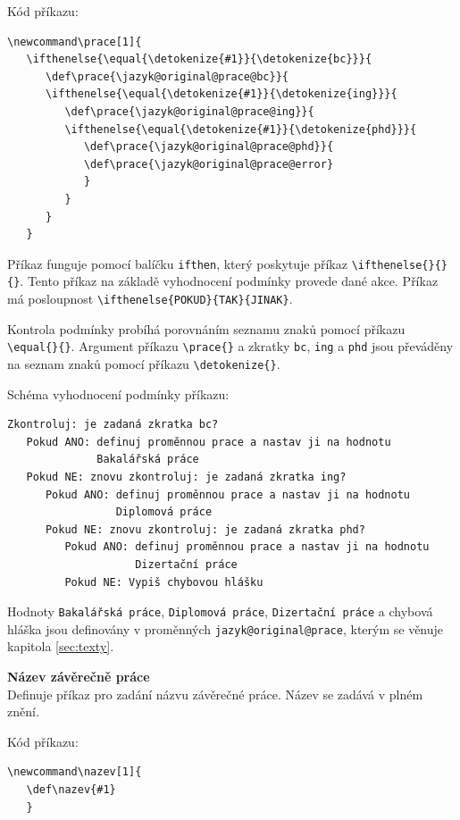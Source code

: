Kód příkazu:
\begin{verbatim}
\newcommand\prace[1]{
   \ifthenelse{\equal{\detokenize{#1}}{\detokenize{bc}}}{
      \def\prace{\jazyk@original@prace@bc}}{
      \ifthenelse{\equal{\detokenize{#1}}{\detokenize{ing}}}{
         \def\prace{\jazyk@original@prace@ing}}{
         \ifthenelse{\equal{\detokenize{#1}}{\detokenize{phd}}}{
            \def\prace{\jazyk@original@prace@phd}}{
            \def\prace{\jazyk@original@prace@error}
            }
         }
      }
   }
\end{verbatim}

Příkaz funguje pomocí balíčku \verb|ifthen|, který poskytuje příkaz \verb|\ifthenelse{}{}{}|. Tento příkaz na základě vyhodnocení podmínky provede dané akce. Příkaz má posloupnost \verb|\ifthenelse{POKUD}{TAK}{JINAK}|.

Kontrola podmínky probíhá porovnáním seznamu znaků pomocí příkazu \verb|\equal{}{}|. Argument příkazu \verb|\prace{}| a zkratky \verb|bc|, \verb|ing| a \verb|phd| jsou převáděny na seznam znaků pomocí příkazu \verb|\detokenize{}|.

Schéma vyhodnocení podmínky příkazu:

\begin{verbatim}
Zkontroluj: je zadaná zkratka bc?
   Pokud ANO: definuj proměnnou prace a nastav ji na hodnotu
              Bakalářská práce
   Pokud NE: znovu zkontroluj: je zadaná zkratka ing?
      Pokud ANO: definuj proměnnou prace a nastav ji na hodnotu
                 Diplomová práce
      Pokud NE: znovu zkontroluj: je zadaná zkratka phd?
         Pokud ANO: definuj proměnnou prace a nastav ji na hodnotu
                    Dizertační práce
         Pokud NE: Vypiš chybovou hlášku
\end{verbatim}

Hodnoty \verb|Bakalářská práce|, \verb|Diplomová práce|, \verb|Dizertační práce| a chybová hláška jsou definovány v proměnných \verb|jazyk@original@prace|, kterým se věnuje kapitola \ref{sec:texty}.

\vspace{8pt}

\textbf{Název závěrečně práce}\\
Definuje příkaz pro zadání názvu závěrečné práce. Název se zadává v plném znění.

Kód příkazu:

\begin{verbatim}
\newcommand\nazev[1]{
   \def\nazev{#1}
   }
\end{verbatim}

